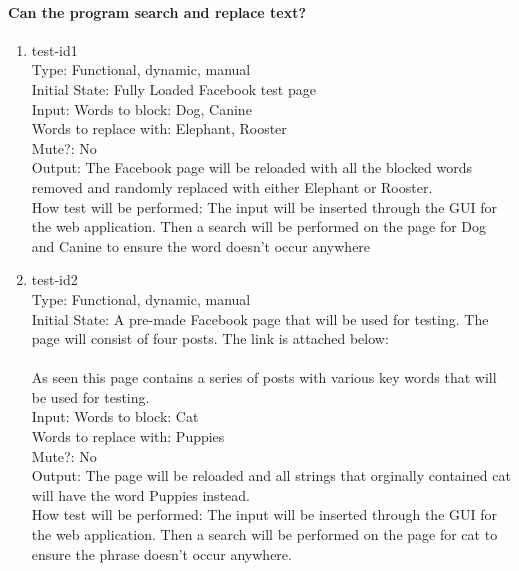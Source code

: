 \documentclass[12pt, titlepage]{article}
\begin{document}
\paragraph{Can the program search and replace text?}
\begin{enumerate}
\item{test-id1\\}
Type: Functional, dynamic, manual\\
					
Initial State: Fully Loaded Facebook test page \\
					
Input: Words to block: Dog, Canine \\
Words to replace with: Elephant, Rooster\\
Mute?: No \\
					
Output: The Facebook page will be reloaded with all the blocked words removed and randomly replaced with either Elephant or Rooster.\\
					
How test will be performed: The input will be inserted through the GUI for the web application. Then a search will be performed on the page for Dog and Canine to ensure the word doesn't occur anywhere
					
\item{test-id2\\}
Type: Functional, dynamic, manual\\
					
Initial State: A pre-made Facebook page that will be used for testing. The page will consist of four posts. The link is attached below:\\
\href{https://www.facebook.com/groups/381406052200910/}\\

As seen this page contains a series of posts with various key words that will be used for testing.\\
					
Input:  Words to block: Cat\\
Words to replace with: Puppies\\
Mute?: No \\
					
Output: The page will be reloaded and all strings that orginally contained cat will have the word Puppies instead. \\

How test will be performed: The input will be inserted through the GUI for the web application. Then a search will be performed on the page for cat to ensure the phrase doesn't occur anywhere.
\end{enumerate}
\end{document}
